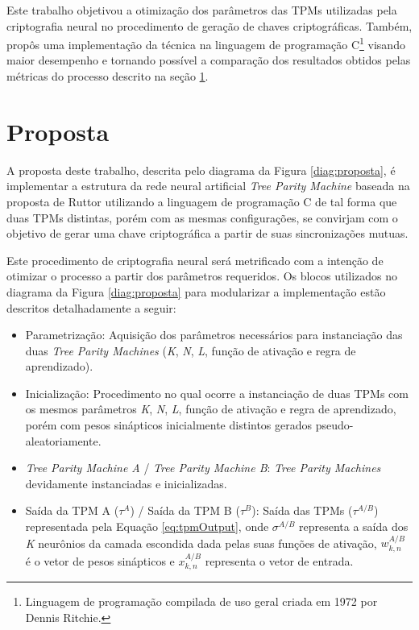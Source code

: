\documentclass[12pt]{article}
\begin{document}
        Este trabalho objetivou a otimização dos parâmetros das TPMs utilizadas pela criptografia neural no procedimento de geração de chaves criptográficas. Também, propôs uma implementação da técnica na linguagem de programação C\footnote{Linguagem de programação compilada de uso geral criada em 1972 por Dennis Ritchie.} visando maior desempenho e tornando possível a comparação dos resultados obtidos pelas métricas do processo descrito na seção \ref{sec:proposta}.
  
    \section{Proposta}
    \label{sec:proposta}
        
        A proposta deste trabalho, descrita pelo diagrama da Figura \ref{diag:proposta}, é implementar a estrutura da rede neural artificial \textit{Tree Parity Machine} baseada na proposta de Ruttor \cite{ruttor2007neural} utilizando a linguagem de programação C de tal forma que duas TPMs distintas, porém com as mesmas configurações, se convirjam com o objetivo de gerar uma chave criptográfica a partir de suas sincronizações mutuas.
        
        Este procedimento de criptografia neural será metrificado com a intenção de otimizar o processo a partir dos parâmetros requeridos. Os blocos utilizados no diagrama da Figura \ref{diag:proposta} para modularizar a implementação estão descritos detalhadamente a seguir: 
        
        
    
        \begin{itemize}
            \item Parametrização:
            Aquisição dos parâmetros necessários para instanciação das duas \textit{Tree Parity Machines} (\textit{K}, \textit{N}, \textit{L}, função de ativação e regra de aprendizado).
                
            \item Inicialização:
            Procedimento no qual ocorre a instanciação de duas TPMs com os mesmos parâmetros \textit{K}, \textit{N}, \textit{L}, função de ativação e regra de aprendizado, porém com pesos sinápticos inicialmente distintos gerados pseudo-aleatoriamente.
                
            \item \textit{Tree Parity Machine A} / \textit{Tree Parity Machine B}:
            \textit{Tree Parity Machines} devidamente instanciadas e inicializadas.
                
            \item Saída da TPM A ($\tau^A$) / Saída da TPM B ($\tau^B$):
            Saída das TPMs ($\tau^{A/B}$) representada pela Equação \eqref{eq:tpmOutput}, onde $\sigma^{A/B}$ representa a saída dos \textit{K} neurônios da camada escondida dada pelas suas funções de ativação, $w^{A/B}_{k,n}$ é o vetor de pesos sinápticos e $x^{A/B}_{k,n}$ representa o vetor de entrada.
            
        \end{itemize}
        
\end{document}
